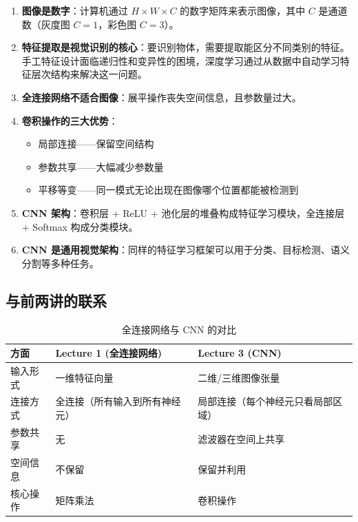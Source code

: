 \documentclass[a4paper]{article}
\begin{document}
\begin{enumerate}
    \item \textbf{图像是数字}：计算机通过 $H \times W \times C$ 的数字矩阵来表示图像，其中 $C$ 是通道数（灰度图 $C=1$，彩色图 $C=3$）。

    \item \textbf{特征提取是视觉识别的核心}：要识别物体，需要提取能区分不同类别的特征。手工特征设计面临递归性和变异性的困境，深度学习通过从数据中自动学习特征层次结构来解决这一问题。

    \item \textbf{全连接网络不适合图像}：展平操作丧失空间信息，且参数量过大。

    \item \textbf{卷积操作的三大优势}：
    \begin{itemize}
        \item 局部连接——保留空间结构
        \item 参数共享——大幅减少参数量
        \item 平移等变——同一模式无论出现在图像哪个位置都能被检测到
    \end{itemize}

    \item \textbf{CNN 架构}：卷积层 + ReLU + 池化层的堆叠构成特征学习模块，全连接层 + Softmax 构成分类模块。

    \item \textbf{CNN 是通用视觉架构}：同样的特征学习框架可以用于分类、目标检测、语义分割等多种任务。
\end{enumerate}

\subsection{与前两讲的联系}

\begin{table}[H]
\centering
\begin{tabular}{p{3cm}p{5cm}p{5cm}}
\toprule
\textbf{方面} & \textbf{Lecture 1 (全连接网络)} & \textbf{Lecture 3 (CNN)} \\
\midrule
输入形式 & 一维特征向量 & 二维/三维图像张量 \\
连接方式 & 全连接（所有输入到所有神经元） & 局部连接（每个神经元只看局部区域） \\
参数共享 & 无 & 滤波器在空间上共享 \\
空间信息 & 不保留 & 保留并利用 \\
核心操作 & 矩阵乘法 & 卷积操作 \\
\bottomrule
\end{tabular}
\caption{全连接网络与 CNN 的对比}
\end{table}
\end{document}
